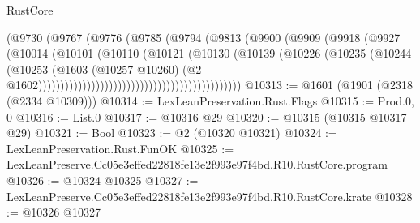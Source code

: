 \begin{lexlean}{RustCore}
\begin{coremodule}
                                                    (@9730
                                                      (@9767
                                                        (@9776
                                                          (@9785
                                                            (@9794
                                                              (@9813
                                                                (@9900
                                                                  (@9909
                                                                    (@9918
                                                                      (@9927
                                                                        (@10014
                                                                          (@10101
                                                                            (@10110
                                                                              (@10121
                                                                                (@10130
                                                                                  (@10139
                                                                                    (@10226
                                                                                      (@10235
                                                                                        (@10244
                                                                                          (@10253
                                                                                            (@1603
                                                                                              (@10257
                                                                                                @10260)
                                                                                              (@2
                                                                                                @1602))))))))))))))))))))))))))))))))))))))))))))))
@10313 := @1601 (@1901 (@2318 (@2334 @10309)))
@10314 := LexLeanPreservation.Rust.Flags
@10315 := Prod.{0, 0}
@10316 := List.{0}
@10317 := @10316 @29
@10320 := @10315 (@10315 @10317 @29)
@10321 := Bool
@10323 := @2 (@10320 @10321)
@10324 := LexLeanPreservation.Rust.FunOK
@10325 := LexLeanPreserve.Cc05e3effed22818fe13e2f993e97f4bd.R10.RustCore.program
@10326 := @10324 @10325
@10327 := LexLeanPreserve.Cc05e3effed22818fe13e2f993e97f4bd.R10.RustCore.krate
@10328 := @10326 @10327

\end{coremodule}
\end{lexlean}
